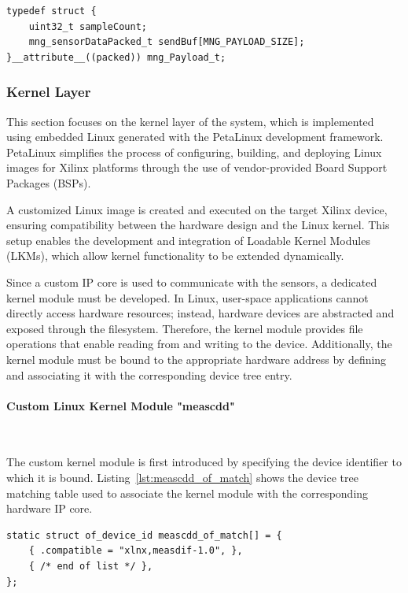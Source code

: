 \documentclass{article}
\begin{document}
\begin{lstlisting}[caption={MNG Payload structure}, label={lst:payloadhandle}]
typedef struct {
    uint32_t sampleCount;
    mng_sensorDataPacked_t sendBuf[MNG_PAYLOAD_SIZE];
}__attribute__((packed)) mng_Payload_t;
\end{lstlisting}


\subsubsection{Kernel Layer}

This section focuses on the kernel layer of the system, which is implemented using embedded Linux generated with the PetaLinux development framework. PetaLinux simplifies the process of configuring, building, and deploying Linux images for Xilinx platforms through the use of vendor-provided Board Support Packages (BSPs).

A customized Linux image is created and executed on the target Xilinx device, ensuring compatibility between the hardware design and the Linux kernel. This setup enables the development and integration of Loadable Kernel Modules (LKMs), which allow kernel functionality to be extended dynamically.

Since a custom IP core is used to communicate with the sensors, a dedicated kernel module must be developed. In Linux, user-space applications cannot directly access hardware resources; instead, hardware devices are abstracted and exposed through the filesystem. Therefore, the kernel module provides file operations that enable reading from and writing to the device. Additionally, the kernel module must be bound to the appropriate hardware address by defining and associating it with the corresponding device tree entry.

\paragraph{Custom Linux Kernel Module "meascdd"}\

The custom kernel module is first introduced by specifying the device identifier 
to which it is bound. Listing~\ref{lst:meascdd_of_match} shows the device tree 
matching table used to associate the kernel module with the corresponding hardware 
IP core.

\begin{lstlisting}[caption={MNG Payload structure}, label={lst:meascdd_of_match}]
static struct of_device_id meascdd_of_match[] = {
	{ .compatible = "xlnx,measdif-1.0", },
	{ /* end of list */ },
};
\end{lstlisting}
\end{document}
